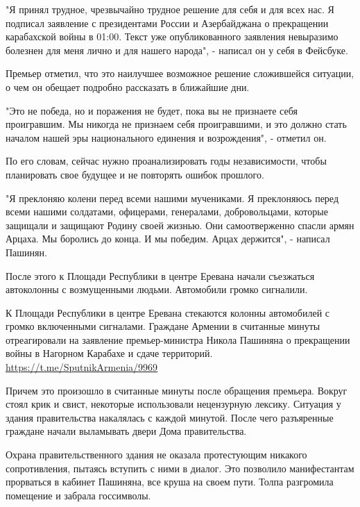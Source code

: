 "Я принял трудное, чрезвычайно трудное решение для себя и для всех нас. Я
подписал заявление с президентами России и Азербайджана о прекращении
карабахской войны в 01:00. Текст уже опубликованного заявления невыразимо
болезнен для меня лично и для нашего народа", - написал он у себя в Фейсбуке.

Премьер отметил, что это наилучшее возможное решение сложившейся ситуации, о
чем он обещает подробно рассказать в ближайшие дни.

"Это не победа, но и поражения не будет, пока вы не признаете себя проигравшим.
Мы никогда не признаем себя проигравшими, и это должно стать началом нашей эры
национального единения и возрождения", - отметил он.

По его словам, сейчас нужно проанализировать годы независимости, чтобы
планировать свое будущее и не повторять ошибок прошлого.

"Я преклоняю колени перед всеми нашими мучениками. Я преклоняюсь перед всеми
нашими солдатами, офицерами, генералами, добровольцами, которые защищали и
защищают Родину своей жизнью. Они самоотверженно спасли армян Арцаха. Мы
боролись до конца. И мы победим. Арцах держится", - написал Пашинян.

После этого к Площади Республики в центре Еревана начали съезжаться автоколонны
с возмущенными людьми. Автомобили громко сигналили. 

\begin{center}
	\begin{fminipage}{0.7\textwidth} 
		К Площади Республики в центре Еревана
		стекаются колонны автомобилей с громко включенными сигналами.
		Граждане Армении в считанные минуты отреагировали на заявление
		премьер-министра Никола Пашиняна о прекращении войны в Нагорном
		Карабахе и сдаче территорий.
		\url{https://t.me/SputnikArmenia/9969}
  \end{fminipage}
\end{center}

Причем это произошло в считанные минуты после обращения премьера. Вокруг стоял
крик и свист, некоторые использовали нецензурную лексику. Ситуация у здания
правительства накалялась с каждой минутой. После чего разъяренные граждане
начали выламывать двери Дома правительства. 

Охрана правительственного здания не оказала протестующим никакого
сопротивления, пытаясь вступить с ними в диалог. Это позволило манифестантам
прорваться в кабинет Пашиняна, все круша на своем пути. Толпа разгромила
помещение и забрала госсимволы.

